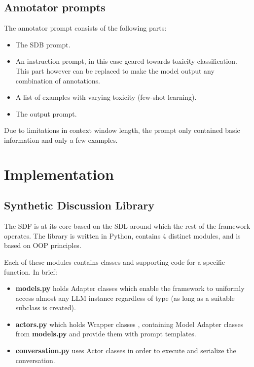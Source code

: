 \subsection{Annotator prompts}
\label{ssec:system:annotator-prompt}

The annotator prompt consists of the following parts:

\begin{itemize}
	\item The \ac{SDB} prompt.
	
	\item An instruction prompt, in this case geared towards toxicity classification. This part however can be replaced to make the model output any combination of annotations.
	
	\item A list of examples with varying toxicity (few-shot learning).
	
	\item The output prompt.
\end{itemize}

Due to limitations in context window length, the prompt only contained basic information and only a few examples.

\section{Implementation}
\label{sec:system:implementation}

\subsection{Synthetic Discussion Library}
\label{ssec:system:library}

The \ac{SDF} is at its core based on the \ac{SDL} around which the rest of the framework operates. The library is written in Python, contains 4 distinct modules, and is based on \ac{OOP} principles.

Each of these modules contains classes and supporting code for a specific function. In brief:

\begin{itemize}
	\item \textbf{models.py} holds Adapter classes \cite{gamma1995design} which enable the framework to uniformly access almost any LLM instance regardless of type (as long as a suitable subclass is created).
	
	\item \textbf{actors.py} which holds Wrapper classes \cite{gamma1995design}, containing Model Adapter classes from \textbf{models.py} and provide them with prompt templates.
	
	\item \textbf{conversation.py} uses Actor classes in order to execute and serialize the conversation.
\end{itemize}

